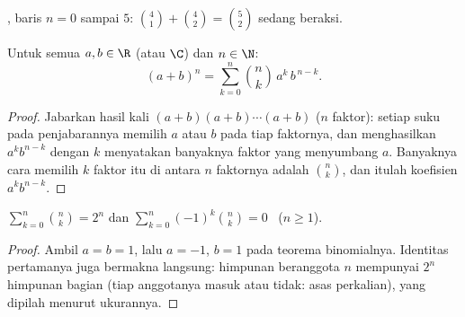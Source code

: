 \begin{omfigure}

{\small {}, baris $n = 0$ sampai $5$: 
$\binom{4}{1} + \binom{4}{2} = \binom{5}{2}$ sedang beraksi.}
\end{omfigure}

\begin{theorem}\label{thm:g12:comb:binomial}
Untuk semua $a, b \in \R$ (atau $\C$) dan $n \in \N$:
\[
(a+b)^n = \sum_{k=0}^{n} \binom{n}{k}\, a^{k}\, b^{\,n-k} .
\]
\end{theorem}

\begin{proof}
Jabarkan hasil kali $(a+b)(a+b)\cdots(a+b)$ ($n$ faktor): setiap suku pada
penjabarannya memilih $a$ atau $b$ pada tiap faktornya, dan menghasilkan
$a^k b^{n-k}$ dengan $k$ menyatakan banyaknya faktor yang menyumbang $a$.
Banyaknya cara memilih $k$ faktor itu di antara $n$ faktornya adalah
$\binom nk$, dan itulah koefisien $a^k b^{n-k}$.
\end{proof}

\begin{corollary}\label{cor:g12:comb:sums}
$\displaystyle\sum_{k=0}^{n} \binom{n}{k} = 2^n$
\quad dan \quad
$\displaystyle\sum_{k=0}^{n} (-1)^k\binom{n}{k} = 0$ \ ($n \geq 1$).
\end{corollary}

\begin{proof}
Ambil $a = b = 1$, lalu $a = -1$, $b = 1$ pada teorema binomialnya. Identitas
pertamanya juga bermakna langsung: himpunan beranggota $n$ mempunyai $2^n$
himpunan bagian (tiap anggotanya masuk atau tidak: asas perkalian), yang
dipilah menurut ukurannya.
\end{proof}

